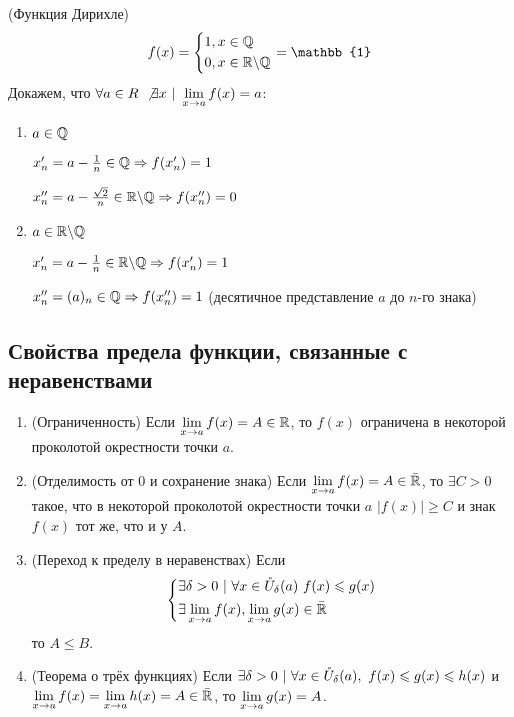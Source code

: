 \begin{example} (Функция Дирихле)
	$$
		f(x) = \System{&{1, x \in \Q} \\ &{0, x \in \R \bs \Q}} = \mathbb{1}
	$$
	Докажем, что $\forall a \in R\ \not\exists x\ |\ \lim\limits_{x \rightarrow a} f(x) = a$:
	
	\begin{enumerate}
		\item $a \in \mathbb{Q}$
		
		$x'_n = a - \frac{1}{n} \in \mathbb{Q} \Rightarrow f(x'_n) = 1$
		
		$x''_n = a - \frac{\sqrt{2}}{n} \in \mathbb{R} \backslash \mathbb{Q} \Rightarrow f(x''_n) = 0$
		
		\item $a \in \mathbb{R} \backslash \mathbb{Q}$
		
		$x'_n = a - \frac{1}{n} \in \mathbb{R} \backslash \mathbb{Q} \Rightarrow f(x'_n) = 1$
		
		$x''_n = (a)_n \in \mathbb{Q} \Rightarrow f(x''_n) = 1$ (десятичное представление $a$ до $n$-го знака)
	\end{enumerate}
\end{example}

\subsection{Свойства предела функции, связанные с неравенствами}

\begin{enumerate}
	\item (Ограниченность) Если $\lim\limits_{x \rightarrow a} f(x) = A \in \mathbb{R}$, то $f(x)$ ограничена в некоторой проколотой окрестности точки $a$.
	
	\item (Отделимость от 0 и сохранение знака) Если $\lim\limits_{x \rightarrow a} f(x) = A \in \bar{\mathbb{R}}$, то $\exists C > 0$ такое, что в некоторой проколотой окрестности точки $a$ $|f(x)| \ge C$ и знак $f(x)$ тот же, что и у $A$.
	
	\item (Переход к пределу в неравенствах) Если 
	$$
	\left\{\begin{aligned}
		&{\exists \delta > 0\ |\ \forall x \in \mathring{U}_{\delta}(a)\ f(x) \leqslant g(x)}
		\\
		&{\exists \lim\limits_{x \rightarrow a} f(x), \lim\limits_{x \rightarrow a} g(x) \in \bar{\mathbb{R}}}
	\end{aligned}\right.
	$$
	то $A \le B$.
	
	\item (Теорема о трёх функциях) Если $\exists \delta > 0\ |\ \forall x \in \mathring{U}_{\delta}(a),\ f(x) \leqslant g(x) \leqslant h(x)$ и $\lim\limits_{x \rightarrow a} f(x) = \lim\limits_{x \rightarrow a} h(x) = A \in \bar{\mathbb{R}}$, то $\lim\limits_{x \rightarrow a} g(x) = A$.
\end{enumerate}

